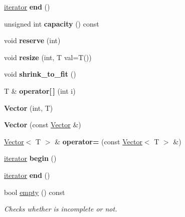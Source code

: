 \begin{DoxyCompactItemize}
\hyperlink{classVector_1_1iterator}{iterator} {\bfseries end} ()
\item 
\mbox{\label{classVector_a68ecb8dc5e1047cead715396d146ed61}} 
unsigned int {\bfseries capacity} () const
\item 
\mbox{\label{classVector_a059385ff13f47a93ce37905fd5d53f3a}} 
void {\bfseries reserve} (int)
\item 
\mbox{\label{classVector_a268b979b2dee0ae72b32759ab760fe18}} 
void {\bfseries resize} (int, T val=T())
\item 
\mbox{\label{classVector_ad6454ce193263b8000d4c18cb0c3a0c8}} 
void {\bfseries shrink\+\_\+to\+\_\+fit} ()
\item 
\mbox{\label{classVector_ada36811f9a98443820d1ebea0e36a429}} 
T \& {\bfseries operator\mbox{[}$\,$\mbox{]}} (int i)
\item 
\mbox{\label{classVector_a8656ea9785cd568035328afec77a753c}} 
{\bfseries Vector} (int, T)
\item 
\mbox{\label{classVector_a4edc1cac2c4cd6d3791280edabd89029}} 
{\bfseries Vector} (const \hyperlink{classVector}{Vector} \&)
\item 
\mbox{\label{classVector_a9c86c24ca13756c7a4f400d26cd88567}} 
\hyperlink{classVector}{Vector}$<$ T $>$ \& {\bfseries operator=} (const \hyperlink{classVector}{Vector}$<$ T $>$ \&)
\item 
\mbox{\label{classVector_a466e8c045ea10d62c28b689888e9fe5a}} 
\hyperlink{classVector_1_1iterator}{iterator} {\bfseries begin} ()
\item 
\mbox{\label{classVector_ae288fa619188bff101d5300b8aaf9a90}} 
\hyperlink{classVector_1_1iterator}{iterator} {\bfseries end} ()
\item 
bool \hyperlink{classVector_ad688a8a0dfbd07ea63d838058a436f79}{empty} () const
\begin{DoxyCompactList}\small\item\em Checks whether is incomplete or not. \end{DoxyCompactList}\item 

\end{DoxyCompactItemize}
